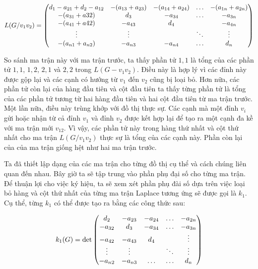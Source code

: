 \documentclass[14pt, a4paper]{article}
\numberwithin{equation}{section}
\numberwithin{figure}{section}
\numberwithin{dl}{section}
\numberwithin{md}{section}
\numberwithin{bd}{section}
\numberwithin{dn}{section}
\numberwithin{hq}{section}
\begin{document}
    \begin{equation}
        L (G / v_1 v_2) = \begin{pmatrix}
            d_1 - a_{21} + d_2 - a_{12} & - (a_{13} + a_{23}) & - (a_{14} + a_{24}) & \hdots & - (a_{1n} + a_{2n}) \\
            - (a_{31} + a{32}) & d_3 & - a_{34} & \hdots & - a_{3n} \\
            - (a_{41} + a{42}) & - a_{43} & d_4 & \thickspace & - a_{4n} \\
            \vdots & \vdots & \thickspace & \ddots & \vdots \\
            - (a_{n1} + a_{n2}) & - a_{n3} & - a_{n4} & \hdots & d_n 
        \end{pmatrix}
    \end{equation}

    So sánh ma trận này với ma trận trước, ta thấy phần tử $1, 1$ là tổng của các phần tử $1, 1$, $1, 2$, $2, 1$ và $2, 2$ trong $L(G - v_1 v_2)$.
    Điều này là hợp lý vì các đỉnh này được gộp lại và các cạnh có hướng từ $v_1$ đến $v_2$ cũng bị loại bỏ.
    Hơn nữa, các phần tử còn lại của hàng đầu tiên và cột đầu tiên ta thấy từng phần tử là tổng của các phần tử tương từ hai hàng đầu tiên và hai cột đầu tiên từ ma trận trước.
    Một lần nữa, điều này trùng khớp với đồ thị thực sự.
    Các cạnh mà một đỉnh $v_i$ gửi hoặc nhận từ cả đỉnh $v_1$ và đỉnh $v_2$ được kết hợp lại để tạo ra một cạnh đa kề với ma trận mới $v_{12}$.
    Vì vậy, các phần tử này trong hàng thứ nhất và cột thứ nhất cho ma trận $L(G/v_1 v_2)$ thực sự là tổng của các cạnh này.
    Phần còn lại của của ma trận giống hệt như hai ma trận trước.

    Ta đã thiết lập dạng của các ma trận cho từng đồ thị cụ thể và cách chúng liên quan đến nhau.
    Bây giờ ta sẽ tập trung vào phần phụ đại số  cho từng ma trận.
    Để thuận lợi cho việc ký hiệu, ta sẽ xem xét phần phụ đài số dựa trên việc loại bỏ hàng và cột thứ nhất của từng ma trận Laplace tương ứng sẽ được gọi là $k_1$.
    Cụ thể, từng $k_1$ có thể được tạo ra bằng các công thức sau:

    \begin{equation}
        k_1(G) = \det\begin{pmatrix}
            d_2 & - a_{23} & - a_{24} & \hdots & - a_{2n} \\
            - a_{32} & d_3 & - a_{34} & \hdots & - a_{3n} \\
            - a_{42} & - a_{43} & d_4 & \thickspace & \vdots \\
            \vdots & \vdots & \thickspace & \ddots & \vdots \\
            - a_{n2} & - a_{n3} & \hdots & \hdots & d_n
        \end{pmatrix}
    \end{equation}
\end{document}
